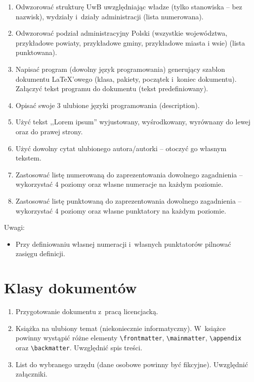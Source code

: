 \documentclass[a4paper,12pt]{article}
\begin{document}
\begin{enumerate}
    \item Odwzorować strukturę UwB uwzględniając władze (tylko stanowiska -- bez nazwisk), wydziały i~działy administracji (lista numerowana).
    \item Odwzorować podział administracyjny Polski (wszystkie województwa, przykładowe powiaty, przykładowe gminy, przykładowe miasta i wsie) (lista punktowana).
    \item Napisać program (dowolny język programowania) generujący szablon dokumentu \LaTeX'owego (klasa, pakiety, początek i~koniec dokumentu). Załączyć tekst programu do dokumentu (tekst predefiniowany).
    \item Opisać swoje 3 ulubione języki programowania (description).
    \item Użyć tekst ,,Lorem ipsum'' wyjustowany, wyśrodkowany, wyrównany do lewej oraz do prawej strony.
    \item Użyć dowolny cytat ulubionego autora/autorki -- otoczyć go własnym tekstem.
    \item Zastosować listę numerowaną do zaprezentowania dowolnego zagadnienia -- wykorzystać 4 poziomy oraz własne numeracje na każdym poziomie.
    \item Zastosować listę punktowaną do zaprezentowania dowolnego zagadnienia -- wykorzystać 4 poziomy oraz własne punktatory na każdym poziomie.
\end{enumerate}

Uwagi:

\begin{itemize}
    \item Przy definiowaniu własnej numeracji i~własnych punktatorów pilnować zasięgu definicji.
\end{itemize}

\section{Klasy dokumentów}

\begin{enumerate}
    \item Przygotowanie dokumentu z~pracą licencjacką.
    \item Książka na ulubiony temat (niekoniecznie informatyczny). W~książce powinny wystąpić różne elementy \verb!\frontmatter!, \verb!\mainmatter!, \verb!\appendix! oraz \verb!\backmatter!. Uwzględnić spis treści. 
    \item List do wybranego urzędu (dane osobowe powinny być fikcyjne). Uwzględnić załączniki.
\end{enumerate}
\end{document}
